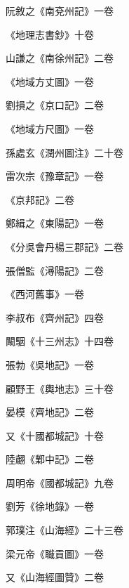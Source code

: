 \begin{pinyinscope}
 阮敘之《南兗州記》一卷



 《地理志書鈔》十卷



 山謙之《南徐州記》二卷



 《地域方丈圖》一卷



 劉損之《京口記》二卷



 《地域方尺圖》一卷



 孫處玄《潤州圖注》二十卷



 雷次宗《豫章記》一卷



 《京邦記》二卷



 鄭緝之《東陽記》一卷



 《分吳會丹楊三郡記》二卷



 張僧監《潯陽記》二卷



 《西河舊事》一卷



 李叔布《齊州記》四卷



 闞駰《十三州志》十四卷



 張勃《吳地記》一卷



 顧野王《輿地志》三十卷



 晏模《齊地記》二卷



 又《十國都城記》十卷



 陸翽《鄴中記》二卷



 周明帝《國都城記》九卷



 劉芳《徐地錄》一卷



 郭璞注《山海經》二十三卷



 梁元帝《職貢圖》一卷



 又《山海經圖贊》二卷




\end{pinyinscope}
